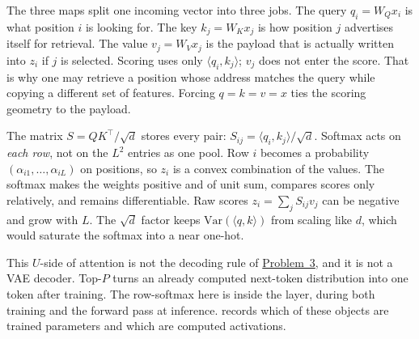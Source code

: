 \documentclass[11pt,a4paper]{article}
\newcommand{\jump}[2]{\hyperref[#1]{#2}}
\theoremstyle{definition}
\begin{document}
\begin{remark}\label{rem:spr2025-nlp-qkv-softmax}
The three maps split one incoming vector into three jobs. The query \(q_i=W_Q x_i\) is what position \(i\) is looking for. The key \(k_j=W_K x_j\) is how position \(j\) advertises itself for retrieval. The value \(v_j=W_V x_j\) is the payload that is actually written into \(z_i\) if \(j\) is selected. Scoring uses only \(\langle q_i,k_j\rangle\); \(v_j\) does not enter the score. That is why one may retrieve a position whose address matches the query while copying a different set of features. Forcing \(q=k=v=x\) ties the scoring geometry to the payload.

The matrix \(S=QK^\top/\sqrt{d}\) stores every pair: \(S_{ij}=\langle q_i,k_j\rangle/\sqrt{d}\). Softmax acts on \emph{each row}, not on the \(L^2\) entries as one pool. Row \(i\) becomes a probability \((\alpha_{i1},\ldots,\alpha_{iL})\) on positions, so \(z_i\) is a convex combination of the values. The softmax makes the weights positive and of unit sum, compares scores only relatively, and remains differentiable. Raw scores \(z_i=\sum_j S_{ij}v_j\) can be negative and grow with \(L\). The \(\sqrt{d}\) factor keeps \(\mathrm{Var}(\langle q,k\rangle)\) from scaling like \(d\), which would saturate the softmax into a near one-hot.

This \(U\)-side of attention is not the decoding rule of \jump{prob:spr2025-nlp-3}{Problem~3}, and it is not a VAE decoder. Top-\(P\) turns an already computed next-token distribution into one token after training. The row-softmax here is inside the layer, during both training and the forward pass at inference.  records which of these objects are trained parameters and which are computed activations.
\end{remark}
\end{document}
